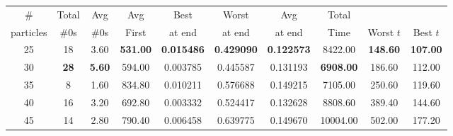 \begin{table}[h]
	\centering
	\tiny \begin{tabular}{cccccccccc}
		
		\hline
		\cellcolor[HTML]{C0C0C0} 
		\#       & 
		Total  & 
		Avg    & 
		Avg    & 
		Best   & 
		Worst & 
		Avg    & 
		Total  &
		          &
		           \\
		
		\cellcolor[HTML]{C0C0C0} 
		particles &
		\#0s       &
		\#0s       &
		First       &
		at end    &
		at end    &
		at end    &
		Time      &
		Worst $t$ &
		Best $t$    \\ 
		
		\hline
		\cellcolor[HTML]{C0C0C0}
		25      & 
		18       &
		{\color[HTML]{3166FF} 3.60} & 
		\textbf{531.00}                & 
		\textbf{0.015486}            & 
		\textbf{0.429090}           & 
		\textbf{0.122573}            & 
		8422.00                         & 
		\textbf{148.60}              & 
		\textbf{107.00}               \\
		
		\cellcolor[HTML]{C0C0C0}30          & 
		\textbf{28}           & 
		\textbf{5.60}        & 
		{\color[HTML]{3166FF} 594.00}  & 
		0.003785 & 
		{\color[HTML]{3166FF} 0.445587} & 
		{\color[HTML]{3166FF} 0.131193} & 
		\textbf{6908.00}                & 
		{\color[HTML]{3166FF} 186.60}  & 
		{\color[HTML]{3166FF} 112.00} \\
		
		\cellcolor[HTML]{C0C0C0}35          & 
		8             & 
		1.60                        & 
		834.80                         & 
		{\color[HTML]{3166FF} 0.010211 }    & 
		0.576688                        & 
		0.149215                        & 
		{\color[HTML]{3166FF} 7105.00}  & 
		250.60                         & 
		119.60                        \\
		
		\cellcolor[HTML]{C0C0C0}40          & 
		16            & 
		3.20                        & 
		692.80                         & 
		0.003332                        & 
		0.524417                        & 
		0.132628                        & 
		8808.60                         & 
		389.40                         & 
		144.60                        \\
		
		\cellcolor[HTML]{C0C0C0}45          & 
		14            & 
		2.80                        & 
		790.40                         & 
		0.006458                        & 
		0.639775                        & 
		{\color[HTML]{FE0000} 0.149670} & 
		10004.00                        & 
		502.00                         & 
		177.20                        \\
		

\end{tabular}
\end{table}

